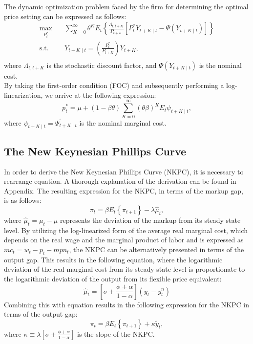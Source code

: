 \documentclass[11pt, a4paper, leqno]{article}
\begin{document}
The dynamic optimization problem faced by the firm for determining the optimal price setting can be expressed as follows:
\begin{equation}
	\begin{aligned}
	\max_{P^{*}_{t}}  \quad & \sum_{K=0}^{\infty} \theta^{K} E_{t} \left\{ \frac{\Lambda_{t,t+K}}{P_{t+K}} \left[ P_{t}^{*} Y_{t+K \mid t} - \Psi \left( Y_{t+K \mid t} \right) \right] \right\} \\
	\textrm{s.t.} \quad & Y_{t+K \mid t} = \left( \frac{P^{*}_{t}}{P_{t+K}} \right) Y_{t+K}, \\
	\end{aligned}
\end{equation}
where $\Lambda_{t,t+K}$ is the stochastic discount factor, and $\Psi \left( Y_{t+K \mid t} \right)$ is the nominal cost.\\
By taking the first-order condition (FOC) and subsequently performing a log-linearization, we arrive at the following expression:
\begin{equation}
	p^{*}_{t} = \mu + \left(1-\beta \theta \right) \sum_{K=0}^{\infty} \left(\theta \beta \right)^{K} E_{t} \psi_{t+K \mid t},
\end{equation}
where $\psi_{t+K \mid t}=\Psi^{'}_{t+K \mid t}$ is the nominal marginal cost.
\subsection{The New Keynesian Phillips Curve}
In order to derive the New Keynesian Phillips Curve (NKPC), it is necessary to rearrange equation. A thorough explanation of the derivation can be found in Appendix. The resulting expression for the NKPC, in terms of the markup gap, is as follows:
\begin{equation}
	\pi_{t} = \beta E_{t} \left\{ \pi_{t+1} \right\} - \lambda \hat{\mu}_{t},
\end{equation}
where $\hat{\mu}_{t}= \mu_{t}-\mu$ represents the deviation of the markup from its steady state level. By utilizing the log-linearized form of the average real marginal cost, which depends on the real wage and the marginal product of labor and is expressed as $mc_{t} = w_{t} - p_{t} - mpn_{t} $, the NKPC can be alternatively presented in terms of the output gap. This results in the following equation, where the logarithmic deviation of the real marginal cost from its steady state level is proportionate to the logarithmic deviation of the output from its flexible price equivalent:
\begin{equation}
	\hat{\mu}_{t}= \left[ \sigma + \frac{\phi + \alpha}{1- \alpha} \right] \left( y_{t} - y_{t}^{n} \right)
\end{equation}
Combining this with equation results in the following expression for the NKPC in terms of the output gap:
\begin{equation}
	\pi_{t} = \beta E_{t} \left\{ \pi_{t+1} \right\} + \kappa \widetilde{y}_{t},
\end{equation}
where $\kappa \equiv \lambda \left[ \sigma + \frac{\phi + \alpha}{1- \alpha} \right] $ is the slope of the NKPC.
\end{document}
